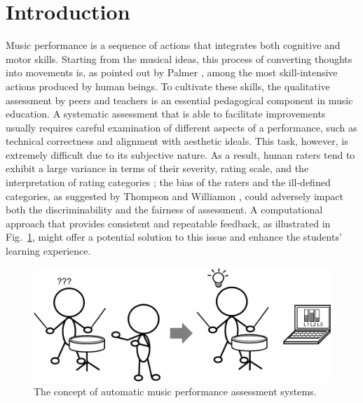 \documentclass[conference]{IEEEtran}
\begin{document}

%
\IEEEpeerreviewmaketitle



\section{Introduction}
Music performance is a sequence of actions that integrates both cognitive and motor skills. Starting from the musical ideas, this process of converting thoughts into movements is, as pointed out by Palmer \cite{Palmer1997}, among the most skill-intensive actions produced by human beings. To cultivate these skills, the qualitative assessment by peers and teachers is an essential pedagogical component in music education. A systematic assessment that is able to facilitate improvements usually requires careful examination of different aspects of a performance, such as technical correctness and alignment with aesthetic ideals. This task, however, is extremely difficult due to its subjective nature. As a result, human raters tend to exhibit a large variance in terms of their severity, rating scale, and the interpretation of rating categories \cite{Wesolowski2016}; the bias of the raters and the ill-defined categories, as suggested by Thompson and Williamon \cite{Thompson2003}, could adversely impact both the discriminability and the fairness of assessment. A computational approach that provides consistent and repeatable feedback, as illustrated in Fig.~\ref{fig:basic_idea}, might offer a potential solution to this issue and enhance the students' learning experience. 

\begin{figure}
\centering
\includegraphics[width = 8 cm]{./figs/basic_idea.pdf}
\caption{The concept of automatic music performance assessment systems.}
\label{fig:basic_idea}
\end{figure}
\end{document}
